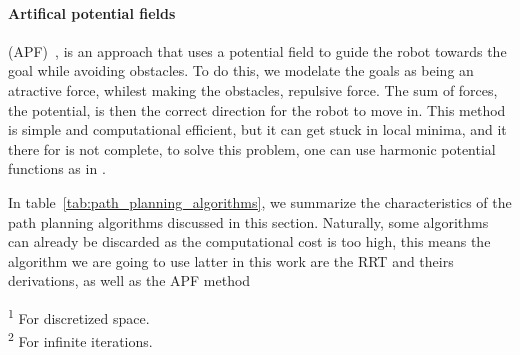 \paragraph{Artifical potential fields} (APF)~\cite{khatib1985real}, is an approach that uses a potential field to guide the robot towards the goal while avoiding obstacles. To do this, we modelate the goals as being an atractive force, whilest making the obstacles, repulsive force. The sum of forces, the potential, is then the correct direction for the robot to move in. This method is simple and computational efficient, but it can get stuck in local minima, and it there for is not complete, to solve this problem, one can use harmonic potential functions as in \cite{kim1992real,rimon1990exact}.

In table~\ref{tab:path_planning_algorithms}, we summarize the characteristics of the path planning algorithms discussed in this section. Naturally, some algorithms can already be discarded as the computational cost is too high, this means the algorithm we are going to use latter in this work are the RRT and theirs derivations, as well as the APF method


\begin{table}[h]
    \centering
    \caption{Path planning algorithms characteristics.}
    \label{tab:path_planning_algorithms}
    
    \vspace{0.5em}
    \raggedright
    \textsuperscript{1} For discretized space.\\
    \textsuperscript{2} For infinite iterations.
\end{table}
    
